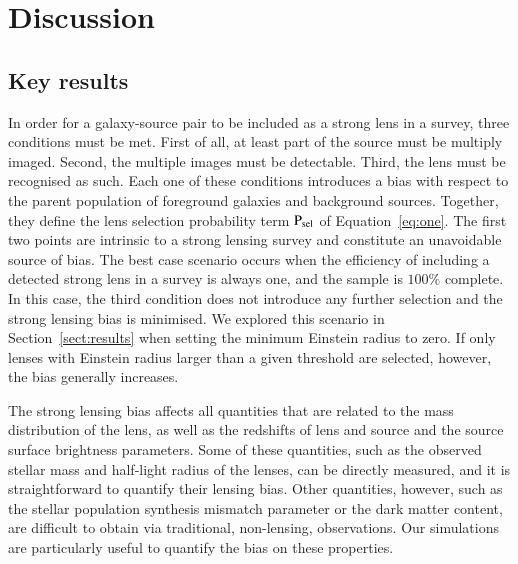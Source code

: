 \documentclass{aa}
\def\psel{{\rm P}_\mathrm{sel}}
\def\Sref#1{Section~\ref{#1}\xspace}
\def\Eref#1{Equation~\ref{#1}\xspace}
\begin{document}

\section{Discussion}\label{sect:discuss}

\subsection{Key results}

In order for a galaxy-source pair to be included as a strong lens in a survey, three conditions must be met.
First of all, at least part of the source must be multiply imaged.
Second, the multiple images must be detectable.
Third, the lens must be recognised as such.
Each one of these conditions introduces a bias with respect to the parent population of foreground galaxies and background sources. Together, they define the lens selection probability term $\psel$ of \Eref{eq:one}.
The first two points are intrinsic to a strong lensing survey and constitute an unavoidable source of bias. 
The best case scenario occurs when the efficiency of including a detected strong lens in a survey is always one, and the sample is $100\%$ complete. In this case, the third condition does not introduce any further selection and the strong lensing bias is minimised.
We explored this scenario in \Sref{sect:results} when setting the minimum Einstein radius to zero.
If only lenses with Einstein radius larger than a given threshold are selected, however, the bias generally increases.

The strong lensing bias affects all quantities that are related to the mass distribution of the lens, as well as the redshifts of lens and source and the source surface brightness parameters.
Some of these quantities, such as the observed stellar mass and half-light radius of the lenses, can be directly measured, and it is straightforward to quantify their lensing bias.
Other quantities, however, such as the stellar population synthesis mismatch parameter or the dark matter content, are difficult to obtain via traditional, non-lensing, observations. Our simulations are particularly useful to quantify the bias on these properties.
\end{document}
